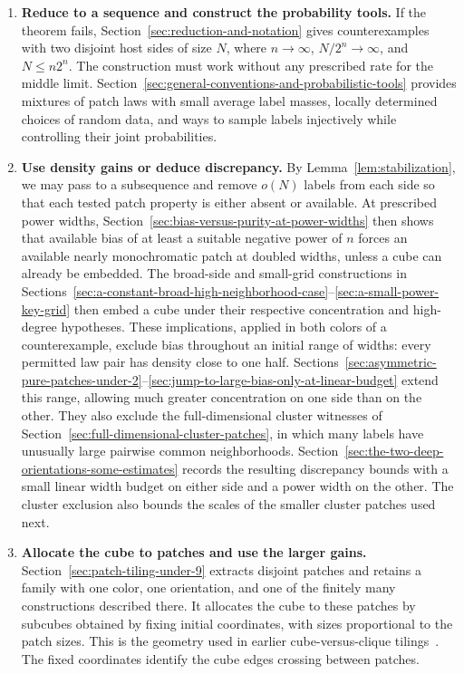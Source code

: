 \begin{enumerate}[leftmargin=*]
\item \textbf{Reduce to a sequence and construct the probability tools.}
If the theorem fails, Section~\ref{sec:reduction-and-notation} gives
counterexamples with two disjoint host sides of size $N$, where
$n\to\infty$, $N/2^n\to\infty$, and $N\le n2^n$. The construction must
work without any prescribed rate for the middle limit.
Section~\ref{sec:general-conventions-and-probabilistic-tools} provides
mixtures of patch laws with small average label masses, locally determined
choices of random data, and ways to sample labels injectively while
controlling their joint probabilities.

\item \textbf{Use density gains or deduce discrepancy.}
By Lemma~\ref{lem:stabilization}, we may pass to a subsequence and
remove $o(N)$ labels from each side so that each tested patch property is
either absent or available. At prescribed power widths,
Section~\ref{sec:bias-versus-purity-at-power-widths} then shows that
available bias of at least a suitable negative power of $n$ forces an
available nearly monochromatic patch at doubled widths, unless a cube can
already be embedded. The broad-side and
small-grid constructions in
Sections~\ref{sec:a-constant-broad-high-neighborhood-case}--\ref{sec:a-small-power-key-grid}
then embed a cube under their respective concentration and high-degree
hypotheses. These implications, applied in both colors of a counterexample,
exclude bias throughout an initial range of widths: every permitted law
pair has density close to one half.
Sections~\ref{sec:asymmetric-pure-patches-under-2}--\ref{sec:jump-to-large-bias-only-at-linear-budget}
extend this range, allowing much greater concentration on one side than
on the other. They also exclude the full-dimensional cluster witnesses
of Section~\ref{sec:full-dimensional-cluster-patches}, in which many
labels have unusually large pairwise common neighborhoods.
Section~\ref{sec:the-two-deep-orientations-some-estimates} records the
resulting discrepancy bounds with a small linear width budget on either
side and a power width on the other. The cluster exclusion also bounds
the scales of the smaller cluster patches used next.

\item \textbf{Allocate the cube to patches and use the larger gains.}
Section~\ref{sec:patch-tiling-under-9} extracts disjoint patches and
retains a family with one color, one orientation, and one of the finitely
many constructions described there. It allocates the cube to these
patches by subcubes obtained by fixing initial coordinates, with sizes
proportional to the patch sizes. This is the geometry used in earlier
cube-versus-clique tilings~\cite{conlon-fox-lee-sudakov2016,fiz-pontiveros-griffiths-morris-saxton-skokan2016}.
The fixed coordinates identify the cube edges crossing between patches.


\end{enumerate}
